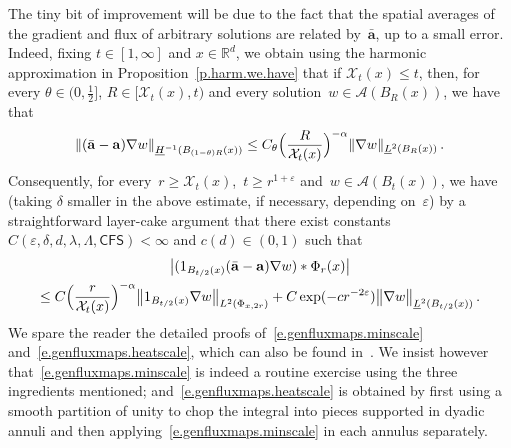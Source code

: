 \documentclass[11pt]{article} %
\numberwithin{equation}{section}
\theoremstyle{definition}
\let\originalleft\left
\let\originalright\right
\renewcommand{\left}{\mathopen{}\mathclose\bgroup\originalleft}
\renewcommand{\right}{\aftergroup\egroup\originalright}
\newcommand{\norm}[1]{\left\|#1\right\|}
\newcommand*{\R}{\ensuremath{\mathbb{R}}}
\newcommand{\eps}{\varepsilon}
\newcommand{\ep}{\eps}
\renewcommand{\a}{\mathbf{a}}
\newcommand{\ahom}{\bar{\a}}
\newcommand{\X}{\mathcal{X}}
\newcommand{\indc}{1}
\newcommand{\CFS}{\mathsf{CFS}}
\newcommand{\A}{\mathcal{A}}
\begin{document}
\smallskip

The tiny bit of improvement will be due to the fact that the spatial averages of the gradient and flux of arbitrary solutions are related by~$\ahom$, up to a small error. Indeed, fixing $t \in [1,\infty]$ and $x \in \R^d$,  we obtain using the harmonic approximation in Proposition~\ref{p.harm.we.have} that if $\X_t(x) \leq t$, then, for every $\theta \in (0,\frac12]$, $R \in [\X_t(x),t)$ and every solution~$w\in \A(B_R(x))$,  we have that
\begin{align}
\label{e.genfluxmaps.minscale}
\norm{ (\ahom - \a ) \nabla w }_{\underline{H}^{-1}(B_{(1-\theta)R}(x))}
\leq
C_\theta \Bigl( \frac{R}{\X_t(x)} \Bigr)^{-\alpha} 
\| \nabla w \|_{\underline{L}^{2} \left( B_{R}(x) \right)}
\,.
\end{align}
Consequently, for every~$r\geq \X_t(x)$,~$t \geq r^{1+\ep}$ and~$w \in \A(B_t(x))$, we have (taking $\delta$ smaller in the above estimate, if necessary, depending on~$\ep$) by a straightforward layer-cake argument that there exist constants~$C(\ep,\delta,d,\lambda,\Lambda,\CFS) < \infty$ and $c(d) \in (0,1)$ such that
\begin{multline}
\label{e.genfluxmaps.heatscale}
\bigl| 
(  \indc_{B_{t/2}(x)} (\ahom  - \a ) \nabla w ) \ast \Phi_{r}(x)   \bigr|
\\ 
\leq
C \Bigl( \frac{r}{\X_t(x)} \Bigr)^{-\alpha} \big\|   \indc_{B_{t/2}(x)}  \nabla w  \big\|_{L^2(\Phi_{x,2r})} 
+ C \exp(-c r^{-2\ep}) \big\| \nabla w \big\|_{\underline{L}^2(B_{t/2}(x))} 
\,.
\end{multline}
We spare the reader the detailed proofs of~\eqref{e.genfluxmaps.minscale} and~\eqref{e.genfluxmaps.heatscale}, which can also be found in~\cite{AKMBook}. We insist however that~\eqref{e.genfluxmaps.minscale} is indeed a routine exercise using the three ingredients mentioned; and~\eqref{e.genfluxmaps.heatscale} is obtained by first using a smooth partition of unity to chop the integral into pieces supported in dyadic annuli and then applying~\eqref{e.genfluxmaps.minscale} in each annulus separately.

\smallskip
\end{document}
